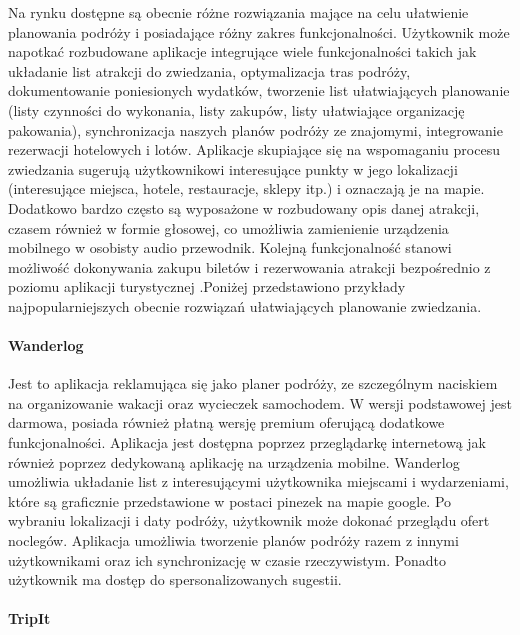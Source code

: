Na rynku dostępne są obecnie różne rozwiązania mające na celu ułatwienie planowania podróży i posiadające różny zakres funkcjonalności.
Użytkownik może napotkać rozbudowane aplikacje integrujące wiele funkcjonalności takich jak układanie list atrakcji do zwiedzania,
optymalizacja tras podróży, dokumentowanie poniesionych wydatków, tworzenie list ułatwiających planowanie (listy czynności do wykonania,
listy zakupów, listy ułatwiające organizację pakowania), synchronizacja naszych planów podróży ze znajomymi, integrowanie rezerwacji hotelowych i lotów.
Aplikacje skupiające się na wspomaganiu procesu zwiedzania sugerują użytkownikowi interesujące punkty w jego lokalizacji (interesujące miejsca, hotele,
restauracje, sklepy itp.) i oznaczają je na mapie. Dodatkowo bardzo często są wyposażone w rozbudowany opis danej atrakcji, czasem również w formie
głosowej, co umożliwia zamienienie urządzenia mobilnego w osobisty audio przewodnik. Kolejną funkcjonalność stanowi możliwość dokonywania zakupu biletów
i rezerwowania atrakcji bezpośrednio z poziomu aplikacji turystycznej .Poniżej przedstawiono przykłady najpopularniejszych obecnie rozwiązań
ułatwiających planowanie zwiedzania.

\paragraph{Wanderlog}

Jest to aplikacja reklamująca się jako planer podróży, ze szczególnym naciskiem na organizowanie wakacji oraz wycieczek samochodem.
W wersji podstawowej jest darmowa, posiada również płatną wersję premium  oferującą dodatkowe funkcjonalności.
Aplikacja jest dostępna poprzez przeglądarkę internetową jak również poprzez dedykowaną aplikację na urządzenia mobilne.
Wanderlog umożliwia układanie list z interesującymi użytkownika miejscami i wydarzeniami, które są graficznie przedstawione w
postaci pinezek na mapie google. Po wybraniu lokalizacji i daty podróży, użytkownik może dokonać przeglądu ofert noclegów.
Aplikacja umożliwia tworzenie planów podróży razem z innymi użytkownikami oraz ich synchronizację w czasie rzeczywistym.
Ponadto użytkownik ma dostęp do spersonalizowanych sugestii.

\paragraph{TripIt}

